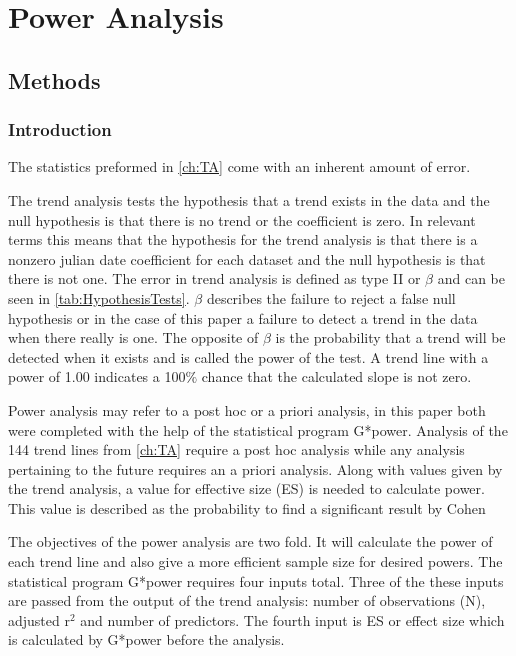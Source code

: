 \chapter{Power Analysis} \label{ch:poweranslysis}

\section{Methods}

\subsection{Introduction}

The statistics preformed in \autoref{ch:TA} come with an inherent amount of error.  

The trend analysis tests the hypothesis that a trend exists in the data and the null hypothesis is that there is no trend or the coefficient is zero.
In relevant terms this means that the hypothesis for the trend analysis is that there is a nonzero julian date coefficient for each dataset and the null hypothesis is that there is not one.
The error in trend analysis is defined as type II or $\beta$ and can be seen in \autoref{tab:HypothesisTests}.
$\beta$ describes the failure to reject a false null hypothesis or in the case of this paper a failure to detect a trend in the data when there really is one.
The opposite of $\beta$ is the probability that a trend will be detected when it exists and is called the power of the test.
A trend line with a power of 1.00 indicates a 100$\%$ chance that the calculated slope is not zero.

Power analysis may refer to a post hoc or a priori analysis, in this paper both were completed with the help of the statistical program G*power.
Analysis of the 144 trend lines from \autoref{ch:TA} require a post hoc analysis while any analysis pertaining to the future requires an a priori analysis. 
Along with values given by the trend analysis, a value for effective size (ES) is needed to calculate power.
This value is described as the probability to find a significant result by Cohen \citep{cohen1992power}

The objectives of the power analysis are two fold.%
It will calculate the power of each trend line and also give a more efficient sample size for desired powers.
The statistical program G*power requires four inputs total.  
Three of the these inputs are passed from the output of the trend analysis: number of observations (N), adjusted r$^2$ and number of predictors.
The fourth input is ES or effect size which is calculated by G*power before the analysis.

